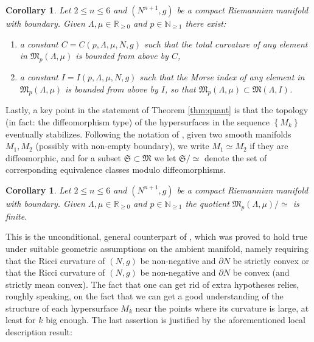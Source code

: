 \documentclass[10pt]{amsart}
\newtheorem{cor}[thm]{Corollary}
\theoremstyle{definition}
\newcommand{\R}{\mathbb{R}}
\newcommand{\N}{\mathbb{N}}
\begin{document}
\begin{cor}\label{cor:totcurvbound}
Let $2\leq n\leq 6$ and $(N^{n+1},g)$ be a compact Riemannian manifold with boundary. Given $\Lambda, \mu\in \R_{\geq 0}$ and $p\in\N_{\geq 1}$ there exist:
\begin{enumerate}
\item
a constant $C=C(p,\Lambda,\mu, N, g)$ such that the total curvature of any element in $\mathfrak{M}_p(\Lambda, \mu)$ is bounded from above by $C$,
\item
a constant $I=I(p,\Lambda,\mu, N, g)$ such that the Morse index of any element in $\mathfrak{M}_p(\Lambda, \mu)$ is bounded from above by $I$, so that $\mathfrak{M}_p(\Lambda,\mu)\subset\mathfrak{M}(\Lambda,I)$.
\end{enumerate}
\end{cor}

Lastly, a key point in the statement of Theorem \ref{thm:quant} is that the topology (in fact: the diffeomorphism type) of the hypersurfaces in the sequence $\left\{M_k\right\}$ eventually stabilizes. Following the notation of \cite{ACS17}, given two smooth manifolds $M_1, M_2$ (possibly with non-empty boundary), we write $M_1\simeq M_2$ if they are diffeomorphic, and for a subset $\mathfrak{S}\subset\mathfrak{M}$ we let $\mathfrak{S}/{\simeq}$ denote the set of corresponding equivalence classes modulo diffeomorphisms.

\begin{cor}\label{cor:finite}
Let $2\leq n\leq 6$ and $(N^{n+1},g)$ be a compact Riemannian manifold with boundary. Given $\Lambda, \mu\in \R_{\geq 0}$ and $p\in \N_{\geq 1}$ the quotient $\mathfrak{M}_p(\Lambda, \mu)/{\simeq}$ is finite.
\end{cor}

This is the unconditional, general counterpart of \cite[Cor.\,7]{ACS17}, which was proved to hold true under suitable geometric assumptions on the ambient manifold, namely requi\-ring that the Ricci curvature of $(N,g)$ be non-negative and $\partial N$ be strictly convex or that the Ricci curvature of $(N,g)$ be non-negative and $\partial N$ be convex (and strictly mean convex). The fact that one can get rid of extra hypotheses relies, roughly speaking, on the fact that we can get a good understanding of the structure of each hyper\-surface $M_k$ near the points where its curvature is large, at least for $k$ big enough.
The last assertion is justified by the aforementioned local description result:
\end{document}
